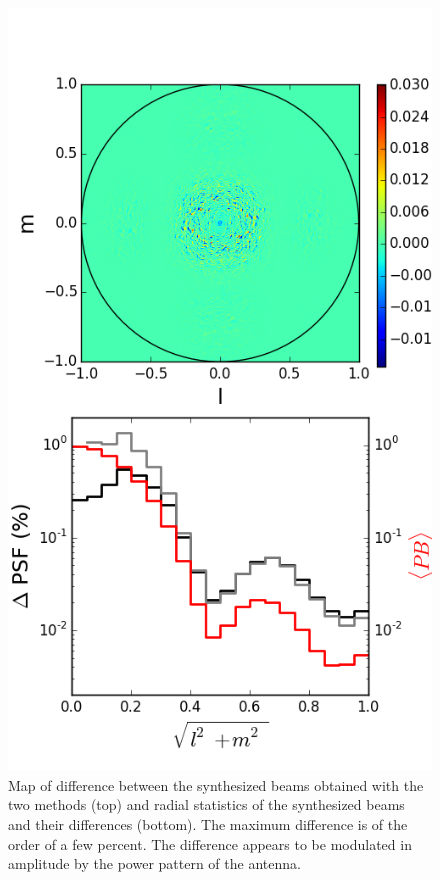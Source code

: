 \documentclass[a4paper,fleqn,usenatbib]{../mnras}
\begin{document}
\begin{figure}
  \includegraphics[width=\columnwidth]{diff_psf_MOFF-FX_test_aperture.png}
  \caption{Map of difference between the synthesized beams obtained with the 
    two methods (top) and radial statistics of the synthesized beams and 
    their differences (bottom). The maximum difference is of the order of a 
    few percent. The difference appears to be modulated in amplitude by the 
    power pattern of the antenna. }
  \label{fig:psf-diff}
\end{figure}
\end{document}
